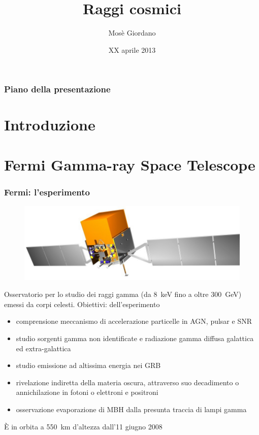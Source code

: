 \documentclass[10pt]{beamer}
\title{Raggi cosmici}
\author{Mosè Giordano}
\date{XX aprile 2013}
\institute[UniSalento]{Università del Salento}
\begin{document}
\begin{frame}
  \maketitle
\end{frame}

\begin{frame}
  \frametitle{Piano della presentazione}
  \tableofcontents
\end{frame}

\section[Intro]{Introduzione}

\begin{frame}
  \frametitle{}

\end{frame}

\section[Fermi]{Fermi Gamma-ray Space Telescope}

\begin{frame}
  \frametitle{Fermi: l'esperimento}
  \begin{figure}
    \centering
    \includegraphics[width=0.5\columnwidth]{glast.jpg}
  \end{figure}
  Osservatorio per lo studio dei raggi gamma (da \SI{8}{\kilo\electronvolt} fino
  a oltre \SI{300}{\giga\electronvolt}) emessi da corpi celesti.  Obiettivi:
  dell'esperimento
  \begin{itemize}
  \item comprensione meccanismo di accelerazione particelle in AGN, pulsar e SNR
  \item studio sorgenti gamma non identificate e radiazione gamma diffusa
    galattica ed extra-galattica
  \item studio emissione ad altissima energia nei GRB
  \item rivelazione indiretta della materia oscura, attraverso suo decadimento o
    annichilazione in fotoni o elettroni e positroni
  \item osservazione evaporazione di MBH dalla presunta traccia di lampi gamma
  \end{itemize}
  È in orbita a \SI{550}{\kilo\metre} d'altezza dall'11 giugno 2008
\end{frame}
\end{document}
